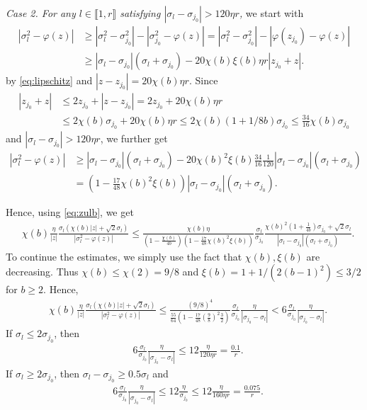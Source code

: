 \documentclass[reqno]{amsart}
\theoremstyle{plain}
\theoremstyle{definition}
\begin{document}
\emph{Case 2. For any $l \in \llbracket 1, r\rrbracket$ satisfying $|\sigma_l-\sigma_{j_0}| > 120 \eta r$, } we start with 
\begin{align*}
|\sigma_l^2 - \varphi(z)| &\ge |\sigma_l^2- \sigma_{j_0}^2| -| \sigma_{j_0}^2 - \varphi(z)|=|\sigma_l^2- \sigma_{j_0}^2| -| \varphi(z_{j_0}) - \varphi(z)|\\
&\ge |\sigma_l-\sigma_{j_0}| (\sigma_l+\sigma_{j_0}) -  20 \chi(b) \xi(b)\eta r|z_{j_0} + z|.
\end{align*}
by \eqref{eq:lipschitz} and $|z-z_{j_0}| = 20\chi(b) \eta r$. Since  
\begin{align*}
|z_{j_0} + z| &\le 2z_{j_0}+| z- z_{j_0}| = 2z_{j_0} +20\chi(b) \eta r\\
& \le 2\chi(b) \sigma_{j_0} +20\chi(b) \eta r \le 2\chi(b) \left(1+ {1}/{8b} \right)\sigma_{j_0} \le \frac{34}{16}\chi(b) \sigma_{j_0}
\end{align*}
 and $|\sigma_l-\sigma_{j_0}| > 120 \eta r$, we further get 
\begin{align*}
|\sigma_l^2 - \varphi(z)| &\ge |\sigma_l-\sigma_{j_0}| (\sigma_l+\sigma_{j_0}) -  20 \chi(b)^2\xi(b) \frac{34}{16}\frac{1}{120} |\sigma_l-\sigma_{j_0}| (\sigma_l+\sigma_{j_0})\\
&=\left( 1- \frac{17}{48} \chi(b)^2\xi(b) \right)|\sigma_l-\sigma_{j_0}| (\sigma_l+\sigma_{j_0}).
\end{align*}

Hence, using  \eqref{eq:zulb}, we get
\begin{align*}
&\chi(b)\frac{\eta}{|z|}\frac{\sigma_l (\chi(b) |z|+\sqrt{2}\sigma_l)}{|\sigma_l^2 - \varphi(z)|} \le \frac{\chi(b) \eta}{(1-\frac{\chi(b)}{4b}) (1-\frac{17}{48} \chi(b)^2\xi(b))} \frac{\sigma_l}{\sigma_{j_0}}\frac{ \chi(b)^2(1+\frac{1}{4b})\sigma_{j_0} + \sqrt{2}\sigma_l }{|\sigma_l-\sigma_{j_0}| (\sigma_l+\sigma_{j_0})}.
\end{align*}
To continue the estimates, we simply use the fact that $\chi(b),\xi(b)$ are decreasing. Thus $\chi(b)\le \chi(2)=9/8$ and $\xi(b)=1+1/(2(b-1)^2)\le 3/2$ for $b\ge 2$. Hence,
\begin{align*}
&\chi(b)\frac{\eta}{|z|}\frac{\sigma_l (\chi(b) |z|+\sqrt{2}\sigma_l)}{|\sigma_l^2 - \varphi(z)|}\le \frac{(9/8)^4}{\frac{55}{64} (1-\frac{17}{48}(\frac{9}{8})^2\frac{3}{2})}\frac{\sigma_l}{\sigma_{j_0}} \frac{\eta}{|\sigma_{j_0}-\sigma_l|} < 6 \frac{\sigma_l}{\sigma_{j_0}} \frac{\eta}{|\sigma_{j_0}-\sigma_l|}.
\end{align*}
If $\sigma_l \le 2 \sigma_{j_0}$, then 
\begin{align*}
&6 \frac{\sigma_l}{\sigma_{j_0}} \frac{\eta}{|\sigma_{j_0}-\sigma_l|} \le 12 \frac{\eta}{120 \eta r} = \frac{0.1}{r}.
\end{align*}
If $\sigma_l \ge 2 \sigma_{j_0}$, then $\sigma_l-\sigma_{j_0} \ge 0.5 \sigma_l $ and 
\begin{align*}
&6 \frac{\sigma_l}{\sigma_{j_0}} \frac{\eta}{|\sigma_{j_0}-\sigma_l|}\le 12 \frac{\eta}{\sigma_{j_0}} \le  12 \frac{\eta}{160\eta r}=\frac{0.075}{r}.
\end{align*}
\end{document}
